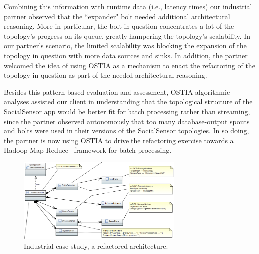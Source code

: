Combining this
information with runtime data (i.e., latency times) our industrial partner observed
that the ``expander" bolt needed additional architectural reasoning. More in particular, the bolt in question concentrates a lot of the topology's progress on its queue, greatly hampering the topology's scalability. In our partner's scenario, the limited scalability was blocking the expansion of the topology in question with more data sources and sinks.
In addition, the partner welcomed the idea of using OSTIA as a mechanism to enact the refactoring of the topology in question as part of the needed architectural
reasoning.

Besides this pattern-based evaluation and assessment, OSTIA algorithmic analyses
assisted our client in understanding that the topological structure of the
SocialSensor app would be better fit for batch processing rather than streaming,
since the partner observed autonomously that too many database-output spouts and
bolts were used in their versions of the SocialSensor topologies. In so doing,
the partner is now using OSTIA to drive the refactoring exercise towards a
Hadoop Map Reduce~\cite{hadoop}
framework for batch processing.


\begin{figure}
\begin{center}
\includegraphics[width=8cm]{images/atc}
		\caption{Industrial case-study, a refactored architecture.}
		\label{atc}
		\end{center}
\end{figure}


